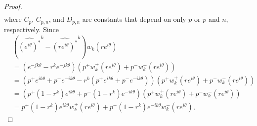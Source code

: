 \documentclass[12pt,reqno]{amsart}
\theoremstyle{definition}
\theoremstyle{remark}
\begin{document}
\begin{proof}
\begin{align*}
        \end{align*}
        where $C_p$, $C_{p,n}$, and $D_{p,n}$ are constants that depend on only $p$ or $p$ and $n$, respectively. Since
        \begin{align*}
            & (\widehat{(e^{i\theta})^*}^k -  \widehat{(re^{i\theta})^*}^k )w_k(re^{i\theta}) \\
            &= (e^{-jk\theta} - r^k e^{-jk\theta}) (p^+ w_k^+(re^{i\theta}) + p^- w_k^-(re^{i\theta})) \\
            &= (p^+ e^{ik\theta} + p^- e^{-ik\theta} - r^k (p^+ e^{ik\theta} + p^- e^{-ik\theta})) (p^+ w_k^+(re^{i\theta}) + p^- w_k^-(re^{i\theta})) \\
            &= (p^+ (1-r^k)e^{ik\theta} + p^- (1-r^k)e^{-ik\theta} ) (p^+ w_k^+(re^{i\theta}) + p^- w_k^-(re^{i\theta})) \\
            &= p^+ (1-r^k)e^{ik\theta}w_k^+(re^{i\theta}) + p^- (1-r^k)e^{-ik\theta} w_k^-(re^{i\theta}),
        \end{align*}


\end{proof}
\end{document}
